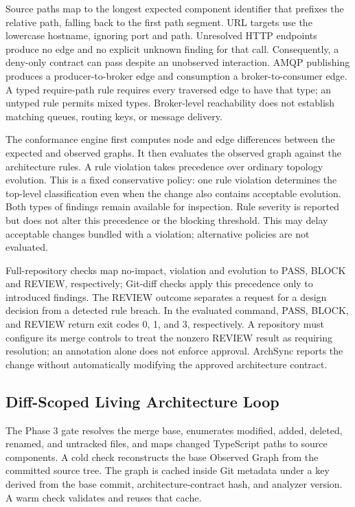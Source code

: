 \documentclass[conference]{IEEEtran}
\begin{document}
Source paths map to the longest expected component identifier that prefixes the relative path, falling back to the first path segment. URL targets use the lowercase hostname, ignoring port and path. Unresolved HTTP endpoints produce no edge and no explicit unknown finding for that call. Consequently, a deny-only contract can pass despite an unobserved interaction. AMQP publishing produces a producer-to-broker edge and consumption a broker-to-consumer edge. A typed require-path rule requires every traversed edge to have that type; an untyped rule permits mixed types. Broker-level reachability does not establish matching queues, routing keys, or message delivery.

The conformance engine first computes node and edge differences between the expected and observed graphs. It then evaluates the observed graph against the architecture rules. A rule violation takes precedence over ordinary topology evolution. This is a fixed conservative policy: one rule violation determines the top-level classification even when the change also contains acceptable evolution. Both types of findings remain available for inspection. Rule severity is reported but does not alter this precedence or the blocking threshold. This may delay acceptable changes bundled with a violation; alternative policies are not evaluated.

Full-repository checks map no-impact, violation and evolution to PASS, BLOCK and REVIEW, respectively; Git-diff checks apply this precedence only to introduced findings.
The REVIEW outcome separates a request for a design decision from a detected rule breach. In the evaluated command, PASS, BLOCK, and REVIEW return exit codes 0, 1, and 3, respectively. A repository must configure its merge controls to treat the nonzero REVIEW result as requiring resolution; an annotation alone does not enforce approval. ArchSync reports the change without automatically modifying the approved architecture contract.

\subsection{Diff-Scoped Living Architecture Loop}

The Phase 3 gate resolves the merge base, enumerates modified, added, deleted, renamed, and untracked files, and maps changed TypeScript paths to source components. A cold check reconstructs the base Observed Graph from the committed source tree. The graph is cached inside Git metadata under a key derived from the base commit, architecture-contract hash, and analyzer version. A warm check validates and reuses that cache.
\end{document}
